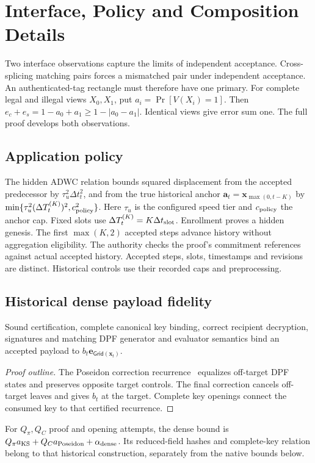 \section{Interface, Policy and Composition Details}
\label{boundary:appendix}
\label{sec:composition-failures}



Two interface observations capture the limits of independent acceptance.
\label{cor:submission-shared-tag}
Cross-splicing matching pairs forces a mismatched pair under independent
acceptance. An authenticated-tag rectangle must therefore have one primary.
\label{sec:history-interface}
For complete legal and illegal views \(X_0,X_1\), put
\(a_i=\Pr[V(X_i)=1]\). Then
\(e_c+e_s=1-a_0+a_1\ge1-|a_0-a_1|\). Identical views give error sum one.
The full proof develops both observations.

\subsection{Application policy}
\label{app:policy}
The hidden ADWC relation bounds squared displacement from the accepted
predecessor by \(\tau_u^2\Delta t_t^2\), and from the true historical anchor
\(\mathbf a_t=\mathbf x_{\max(0,t-K)}\) by
\(\min\{\tau_u^2(\Delta T_t^{(K)})^2,c_{\rm policy}^2\}\).
Here \(\tau_u\) is the configured speed tier and \(c_{\rm policy}\)
the anchor cap. Fixed slots use
\(\Delta T_t^{(K)}=K\Delta t_{\rm slot}\).
Enrollment proves a hidden genesis. The first \(\max(K,2)\) accepted
steps advance history without aggregation eligibility. The authority
checks the proof's commitment references against actual accepted history.
Accepted steps, slots, timestamps and revisions are distinct.
Historical controls use their recorded caps and preprocessing.

\subsection{Historical dense payload fidelity}
\label{app:dense-binding}
\begin{lemma}
\label{thm:main-payload-fidelity}
\label{lem:submission-dpf-recurrence}
Sound certification, complete canonical key binding, correct recipient
decryption, signatures and matching DPF generator and evaluator semantics
bind an accepted payload to \(b_t\mathbf e_{\mathsf{Grid}(\mathbf x_t)}\).
\end{lemma}
\begin{proof}[Proof outline]
The Poseidon correction recurrence~\cite{Grassi2021Poseidon} equalizes
off-target DPF states and preserves opposite target controls. The final
correction cancels off-target leaves and gives \(b_t\) at the target.
Complete key openings connect the consumed key to that certified recurrence.
\end{proof}
For \(Q_\pi,Q_C\) proof and opening attempts, the dense bound is
\(Q_\pi a_{\rm KS}+Q_Ca_{\rm Poseidon}+\alpha_{\rm dense}\).
Its reduced-field hashes and complete-key relation belong to that
historical construction, separately from the native bounds below.

